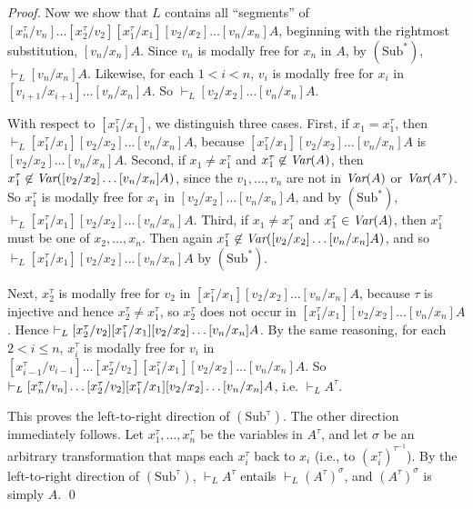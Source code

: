 \documentclass[11pt]{woarticle}
\newcommand{\cmnt}[1]{\iffalse #1 \fi}
\theoremstyle{break}
\theoremstyle{nonumberplain}
\newcommand{\1}{\;\,|\;\,}
\newcommand{\var}{\emph{Var}}
\newcommand{\T}[1]{\ensuremath{(\mathrm{ #1})}}
\begin{document}
\begin{proof}
  Now we show that $L$ contains all ``segments'' of
  $[x_{n}^\tau/v_{n}]\ldots[x_2^\tau/v_2][x_1^\tau/x_1][v_2/x_2]\ldots[v_n/x_n]A$,
  beginning with the rightmost substitution, $[v_n/x_n]A$.  Since
  $v_n$ is modally free for $x_n$ in $A$, by \T{Sub^*}, $\vdash_{L}
  [v_n/x_n]A$. Likewise, for each $1 < i < n$, $v_i$ is modally free
  for $x_i$ in $[v_{i+1}/x_{i+1}]\ldots [v_n/x_n]A$. So $\vdash_{L}
  [v_2/x_2]\ldots[v_n/x_n]A$.

  With respect to $[x_1^\tau/x_1]$, we distinguish three cases. First,
  if $x_1 = x_1^\tau$, then $\vdash_L
  [x_1^\tau/x_1][v_2/x_2]\ldots[v_n/x_n]A$, because
  $[x_1^\tau/x_1][v_2/x_2]\ldots[v_n/x_n]A$ is
  $[v_2/x_2]\ldots[v_n/x_n]A$. Second, if $x_1 \not= x_1^\tau$ and
  $x_1^\tau \not\in \var(A)$, then $x_1^\tau \not\in
  \var([v_2/x_2]\ldots[v_n/x_n]A)$, since the $v_1,\ldots,v_n$ are not
  in $\var(A)$ or $\var(A^\tau)$\cmnt{ (in particular, thus no new
    variables are introduced in $[v_2/x_2]\ldots[v_n/x_n]A$)}. So
  $x_1^\tau$ is modally free for $x_1$ in $[v_2/x_2]\ldots[v_n/x_n]A$,
  and by \T{Sub^*}, $\vdash_L
  [x_1^\tau/x_1][v_2/x_2]\ldots[v_n/x_n]A$. Third, if $x_1 \not=
  x_1^\tau$ and $x_1^\tau \in \var(A)$, then $x_1^\tau$ must be one of
  $x_2,\ldots,x_n$. Then again $x_1^\tau \not\in
  \var([v_2/x_2]\ldots[v_n/x_n]A)$, and so $\vdash_L
  [x_1^\tau/x_1][v_2/x_2]\ldots[v_n/x_n]A$ by \T{Sub^*}.

  Next, $x_2^\tau$ is modally free for $v_2$ in
  $[x_1^\tau/x_1][v_2/x_2]\ldots[v_n/x_n]A$, because $\tau$ is
  injective and hence $x_2^\tau \not= x_1^\tau$, so $x_2^\tau$ does
  not occur in $[x_1^\tau/x_1][v_2/x_2]\ldots[v_n/x_n]A$. Hence
  $\vdash_{L} [x_2^\tau/v_2] [x_1^\tau/x_1]\linebreak[1] [v_2/x_2]
  \ldots[v_n/x_n]A$. By the same reasoning, for each $2 < i \leq n$,
  $x_i^\tau$ is modally free for $v_i$ in
  $[x_{i-1}^\tau/v_{i-1}]\ldots[x_2^\tau/v_2][x_1^\tau/x_1][v_2/x_2]\ldots[v_n/x_n]A$.
  So $\vdash_{L}
  [x_{n}^\tau/v_{n}]\ldots[x_2^\tau/v_2][x_1^\tau/x_1][v_2/x_2]\ldots
  \linebreak[1] [v_n/x_n]A$, i.e. $\vdash_L A^\tau$.

  This proves the left-to-right direction of \T{Sub^\tau}. The other
  direction immediately follows. Let $x_1^\tau,\ldots,x_n^\tau$ be the
  variables in $A^\tau$, and let $\sigma$ be an arbitrary
  transformation that maps each $x_i^\tau$ back to $x_i$ (i.e., to
  $(x_i^\tau)^{\tau^{-1}}$). By the left-to-right direction of
  \T{Sub^\tau}, $\vdash_L A^\tau$ entails $\vdash_L (A^\tau)^\sigma$,
  and $(A^\tau)^\sigma$ is simply $A$. \qed
\end{proof}
\end{document}

